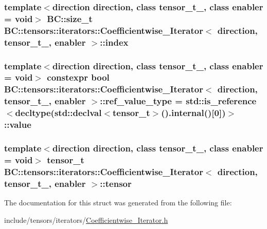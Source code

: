 \subsubsection[{\texorpdfstring{index}{index}}]{\setlength{\rightskip}{0pt plus 5cm}template$<$direction direction, class tensor\+\_\+t\+\_\+, class enabler = void$>$ {\bf B\+C\+::size\+\_\+t} {\bf B\+C\+::tensors\+::iterators\+::\+Coefficientwise\+\_\+\+Iterator}$<$ {\bf direction}, tensor\+\_\+t\+\_\+, enabler $>$\+::index}\hypertarget{structBC_1_1tensors_1_1iterators_1_1Coefficientwise__Iterator_aa8b7cbef11c819b0bff18977500e0f19}{}\label{structBC_1_1tensors_1_1iterators_1_1Coefficientwise__Iterator_aa8b7cbef11c819b0bff18977500e0f19}
\subsubsection[{\texorpdfstring{ref\+\_\+value\+\_\+type}{ref_value_type}}]{\setlength{\rightskip}{0pt plus 5cm}template$<$direction direction, class tensor\+\_\+t\+\_\+, class enabler = void$>$ constexpr bool {\bf B\+C\+::tensors\+::iterators\+::\+Coefficientwise\+\_\+\+Iterator}$<$ {\bf direction}, tensor\+\_\+t\+\_\+, enabler $>$\+::ref\+\_\+value\+\_\+type = std\+::is\+\_\+reference$<$decltype(std\+::declval$<${\bf tensor\+\_\+t}$>$().internal()\mbox{[}0\mbox{]})$>$\+::value\hspace{0.3cm}{\ttfamily [static]}}\hypertarget{structBC_1_1tensors_1_1iterators_1_1Coefficientwise__Iterator_a2403b3f40c2a5266a68a74508061946c}{}\label{structBC_1_1tensors_1_1iterators_1_1Coefficientwise__Iterator_a2403b3f40c2a5266a68a74508061946c}
\subsubsection[{\texorpdfstring{tensor}{tensor}}]{\setlength{\rightskip}{0pt plus 5cm}template$<$direction direction, class tensor\+\_\+t\+\_\+, class enabler = void$>$ {\bf tensor\+\_\+t} {\bf B\+C\+::tensors\+::iterators\+::\+Coefficientwise\+\_\+\+Iterator}$<$ {\bf direction}, tensor\+\_\+t\+\_\+, enabler $>$\+::tensor}\hypertarget{structBC_1_1tensors_1_1iterators_1_1Coefficientwise__Iterator_a73ff638ac0260b4ff4b5f16ac808b7a5}{}\label{structBC_1_1tensors_1_1iterators_1_1Coefficientwise__Iterator_a73ff638ac0260b4ff4b5f16ac808b7a5}


The documentation for this struct was generated from the following file\+:\begin{DoxyCompactItemize}
\item 
include/tensors/iterators/\hyperlink{Coefficientwise__Iterator_8h}{Coefficientwise\+\_\+\+Iterator.\+h}\end{DoxyCompactItemize}
